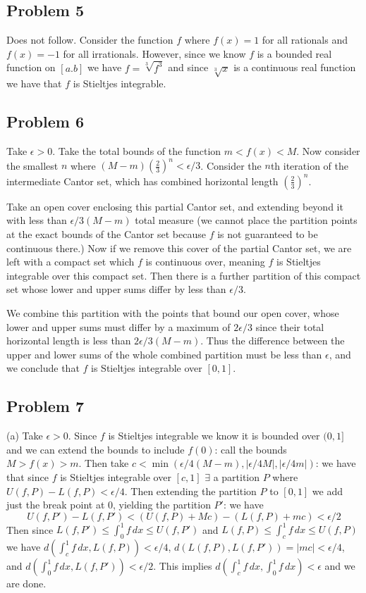 \documentclass{amsart}
\begin{document}
\subsection*{Problem 5}
Does not follow. Consider the function $f$ where $f(x)=1$ for all rationals and $f(x)=-1$ for all irrationals. However, since we know $f$ is a bounded real function on $[a.b]$ we have $f=\sqrt[3]{f^3}$ and since $\sqrt[3]{x}$ is a continuous real function we have that $f$ is Stieltjes integrable.

\subsection*{Problem 6}
Take $\epsilon>0$. Take the total bounds of the function $m<f(x)<M$. Now consider the smallest $n$ where $(M-m)(\frac{2}{3})^n<\epsilon/3$. Consider the $n$th iteration of the intermediate Cantor set, which has combined horizontal length $(\frac{2}{3})^n$. 

\medskip \noindent Take an open cover enclosing this partial Cantor set, and extending beyond it with less than $\epsilon/3(M-m)$ total measure (we cannot place the partition points at the exact bounds of the Cantor set because $f$ is not guaranteed to be continuous there.) Now if we remove this cover of the partial Cantor set, we are left with a compact set which $f$ is continuous over, meaning $f$ is Stieltjes integrable over this compact set. Then there is a further partition of this compact set whose lower and upper sums differ by less than $\epsilon/3$.

\medskip \noindent We combine this partition with the points that bound our open cover, whose lower and upper sums must differ by a maximum of $2\epsilon/3$ since their total horizontal length is less than $2\epsilon/3(M-m)$. Thus the difference between the upper and lower sums of the whole combined partition must be less than $\epsilon$, and we conclude that $f$ is Stieltjes integrable over $[0,1]$. 

\subsection*{Problem 7}
(a) Take $\epsilon>0$. Since $f$ is Stieltjes integrable we know it is bounded over $(0, 1]$ and we can extend the bounds to include $f(0)$: call the bounds $M>f(x)>m$. Then take $c<\min(\epsilon/4(M-m),|\epsilon/4M|,|\epsilon/4m|)$: we have that since $f$ is Stieltjes integrable over $[c,1]$ $\exists$ a partition $P$ where $U(f,P)-L(f,P)<\epsilon/4$. Then extending the partition $P$ to $[0,1]$ we add just the break point at $0$, yielding the partition $P'$: we have \[U(f,P')-L(f,P')<(U(f,P)+Mc)-(L(f,P)+mc)<\epsilon/2\]
Then since $L(f,P')\leq\int_0^1f\,dx\leq U(f,P')$ and $L(f,P)\leq\int_c^1f\,dx\leq U(f,P)$ we have $d(\int_c^1f\,dx, L(f,P))<\epsilon/4$, $d(L(f,P), L(f,P'))=|mc|<\epsilon/4$, and $d(\int_0^1f\, dx, L(f,P'))<\epsilon/2$. This implies $d(\int_c^1f\,dx,\int_0^1f\,dx)<\epsilon$ and we are done.
\end{document}
